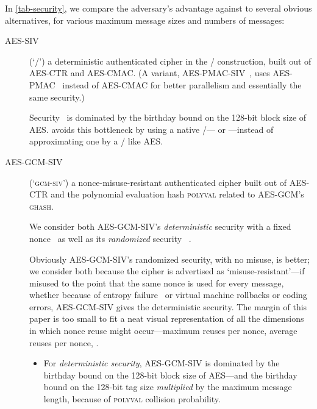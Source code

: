 \documentclass[draft]{article}
\DeclareRobustCommand{\operatorsc}[1]{{%
  \ifmmode\let\next=\operatorname\else\let\next=\relax\fi\next{\textsc{#1}}}}
\def\Salsa#1/{\operatorsc{Salsa#1}}
\def\ChaCha#1/{\operatorsc{ChaCha#1}}
\def\Daence/{\operatorsc{Daence}}
\def\GHASH/{\textsc{ghash}}
\def\POLYVAL/{\textsc{polyval}}
\def\GCMSIV/{\textsc{gcm\nobreakdash-siv}}
\def\AES/{AES}
\def\AESCTR/{AES\nobreakdash-CTR}
\def\AESSIV/{AES\nobreakdash-CTR}
\def\AESCMAC/{AES\nobreakdash-CMAC}
\def\AESPMAC/{AES\nobreakdash-PMAC}
\def\AESSIV/{AES\nobreakdash-SIV}
\def\AESGCM/{AES\nobreakdash-GCM}
\def\AESGCMSIV/{AES\nobreakdash-GCM\nobreakdash-SIV}
\def\AESPMACSIV/{AES\nobreakdash-PMAC\nobreakdash-SIV}
\begin{document}
In \autoref{tab-security}, we compare the adversary's advantage against
 \Daence/ to several obvious alternatives, for various maximum message
 sizes and numbers of messages:

\begin{description}
  \item[\AESSIV/] (`\SIV/')
     a deterministic authenticated cipher in the \SIV/ construction,
     built out of \AESCTR/ and \AESCMAC/.
    (A variant, \AESPMACSIV/~\cite{arcieri2018aespmacsiv}, uses
     \AESPMAC/~\cite{black-rogaway2002pmac-eurocrypt} instead of
     \AESCMAC/ for better parallelism and essentially the same
     security.)

    Security~%
     \cite[\S4, Theorem~2]{rogaway-shrimpton2006keywrap}%
     \cite[\S5, Theorem~3, with $p=1$]{rogaway-shrimpton2006keywrap}%
     \cite[\S2, Theorem~2.2]{bernstein2005permutations}
     is dominated by the birthday bound on the 128-bit block size of
     \AES/.
    \Daence/ avoids this bottleneck by using a native \PRF/---\Salsa20/
     or \ChaCha/---instead of approximating one by a \PRP/ like \AES/.

  \item[\AESGCMSIV/] (`\GCMSIV/')
     a nonce-misuse-resistant authenticated cipher built out of
     \AESCTR/ and the polynomial evaluation hash \POLYVAL/ related to
     \AESGCM/'s \GHASH/.

    We consider both \AESGCMSIV/'s \emph{deterministic} security with a
     fixed nonce~%
     \cite[\S4, Theorem~3, with 256-bit \AES/ keys and $Q=1$ distinct
       nonces]{iwata-seurin2017gcmsivsecurity}
     as well as its \emph{randomized} security~%
     \cite[\S3.3, Corollary~1, with 256-bit \AES/ keys and random
       nonces]{iwata-seurin2017gcmsivsecurity}.

    Obviously \AESGCMSIV/'s randomized security, with no misuse, is
     better; we consider both because the cipher is advertised as
     `misuse-resistant'---if misused to the point that the same nonce
     is used for every message, whether because of entropy
     failure~%
     \cite{debian-dsa-1571-1-openssl}%
     \cite{hdwh2012miningpsqs}
     or virtual machine
     rollbacks or coding errors, \AESGCMSIV/ gives the deterministic
     security.
    The margin of this paper is too small to fit a neat visual
     representation of all the dimensions in which nonce reuse might
     occur---maximum reuses per nonce, average reuses per nonce, \etc.
    \begin{itemize}
      \item For \emph{deterministic security}, \AESGCMSIV/ is dominated
         by the birthday bound on the 128-bit block size of \AES/---and
         the birthday bound on the 128-bit tag size \emph{multiplied}
         by the maximum message length, because of \POLYVAL/ collision
         probability.


\end{itemize}
\end{description}
\end{document}
